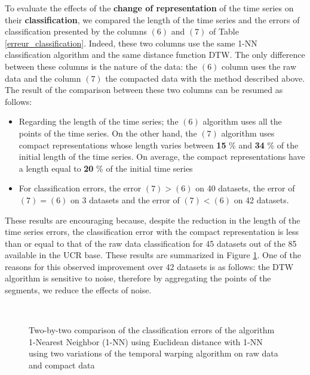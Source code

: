 To evaluate the effects of the \textbf{change of representation} of the time series on their
\textbf{classification}, we compared the length of the time series and the errors of
classification presented by the columns $ (6) $ and $ (7) $ of Table  \ref{erreur_classification}.
Indeed, these two columns use the same 1-NN classification algorithm and the same 
distance function DTW. The only difference between these columns is the nature of the data: the $ (6) $ column
uses the raw data and the column $ (7) $ the compacted data with the method described above. The result of the comparison between these two columns can be resumed as follows:

\begin{itemize}
\item Regarding the length of the time series; the $ (6) $ algorithm uses all the points of
the time series. On the other hand, the $ (7) $ algorithm uses compact representations whose
length varies between \textbf{15} \% and \textbf{34} \% of the initial length of the time series.
On average, the compact representations have a length equal to \textbf {20} \% of the initial time series
\item For classification errors, the error $ (7)> (6) $ on 40 datasets,
the error of $ (7) = (6) $ on 3 datasets and the error of $ (7) <(6) $ on 42 datasets.
\end {itemize}

 These results are encouraging because, despite the reduction in the length of the time series
 errors, the classification error with the compact representation is less than or equal to
that of the raw data classification for 45 datasets out of the 85 available in the
UCR base. These results are summarized in Figure \ref{synthesis}. One of the reasons for this observed improvement over 42 datasets is as follows: the DTW algorithm  is sensitive to noise, therefore by aggregating the points of the segments, we reduce the effects of noise.



\begin{figure}
\center
{}
\\

\caption{Two-by-two comparison of the classification errors of the algorithm
1-Nearest Neighbor (1-NN) using Euclidean distance with 1-NN using two variations of the temporal warping algorithm on raw data
 and compact data}

\label{synthesis}

\end{figure}



